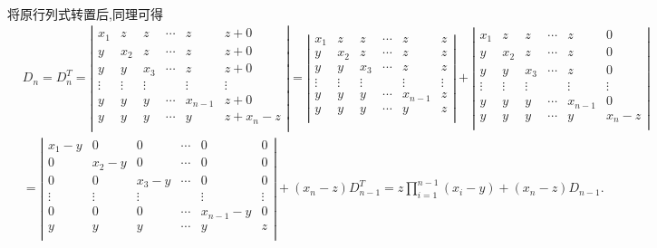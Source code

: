 \documentclass[../../main.tex]{subfiles}
\begin{document}
\begin{solution}
\begin{align}
\label{eq:递推式1.2}
\end{align}
将原行列式转置后,同理可得
\begin{align}
&D_n=D_{n}^{T}=\left| \begin{matrix}
x_1&		z&		z&		\cdots&		z&		z+0\\
y&		x_2&		z&		\cdots&		z&		z+0\\
y&		y&		x_3&		\cdots&		z&		z+0\\
\vdots&		\vdots&		\vdots&		&		\vdots&		\vdots\\
y&		y&		y&		\cdots&		x_{n-1}&		z+0\\
y&		y&		y&		\cdots&		y&		z+x_n-z\\
\end{matrix} \right|=\left| \begin{matrix}
x_1&		z&		z&		\cdots&		z&		z\\
y&		x_2&		z&		\cdots&		z&		z\\
y&		y&		x_3&		\cdots&		z&		z\\
\vdots&		\vdots&		\vdots&		&		\vdots&		\vdots\\
y&		y&		y&		\cdots&		x_{n-1}&		z\\
y&		y&		y&		\cdots&		y&		z\\
\end{matrix} \right|+\left| \begin{matrix}
x_1&		z&		z&		\cdots&		z&		0\\
y&		x_2&		z&		\cdots&		z&		0\\
y&		y&		x_3&		\cdots&		z&		0\\
\vdots&		\vdots&		\vdots&		&		\vdots&		\vdots\\
y&		y&		y&		\cdots&		x_{n-1}&		0\\
y&		y&		y&		\cdots&		y&		x_n-z\\
\end{matrix} \right|
\nonumber\\
&=\left| \begin{matrix}
x_1-y&		0&		0&		\cdots&		0&		0\\
0&		x_2-y&		0&		\cdots&		0&		0\\
0&		0&		x_3-y&		\cdots&		0&		0\\
\vdots&		\vdots&		\vdots&		&		\vdots&		\vdots\\
0&		0&		0&		\cdots&		x_{n-1}-y&		0\\
y&		y&		y&		\cdots&		y&		z\\
\end{matrix} \right|+\left( x_n-z \right) D_{n-1}^{T}=z\prod\limits_{i=1}^{n-1}{\left( x_i-y \right)}+\left( x_n-z \right) D_{n-1}.

\end{align}
\end{solution}
\end{document}
